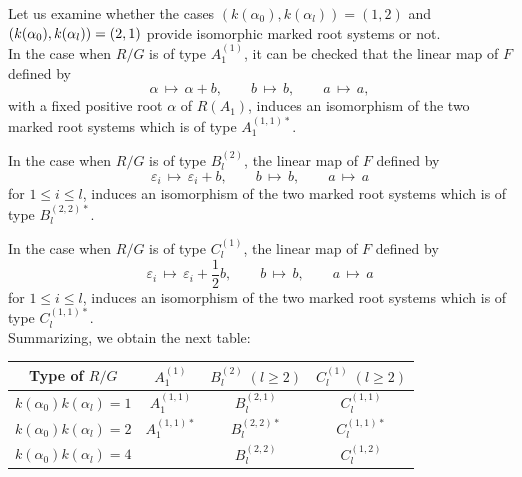\documentclass[11pt]{amsart}
\newcommand{\vep}{\varepsilon}
\begin{document}
{Let us examine whether the cases $(k(\alpha_0), k(\alpha_l))=(1,2)$ and 
$(k(\alpha_0), k(\alpha_l))\\ =(2,1)$ provide isomorphic marked root systems or not. \\

In the case when $R/G$ is of type $A_1^{(1)}$, it can be checked that the linear map of 
$F$ defined by 
\[ \alpha\,  \mapsto\,  \alpha+b, \qquad b\,  \mapsto\,  b, \qquad a\,  \mapsto\,  a, \]
with a fixed positive root $\alpha$ of $R(A_1)$, 
induces an isomorphism of the two marked root systems which is of type $A_1^{(1,1)\ast}$.

In the case when $R/G$ is of type $B_l^{(2)}$,  the linear map of $F$ defined by 
\[ \vep_i \,  \mapsto\,  \vep_i+b, \qquad b\,  \mapsto\,  b, \qquad a\,  \mapsto\,  a \]
for $1\leq i\leq l$, 
induces an isomorphism of the two marked root systems which is of type $B_l^{(2,2)\ast}$.

In the case when $R/G$ is of type $C_l^{(1)}$,  the linear map of $F$ defined by 
\[ \vep_i \,  \mapsto\,  \vep_i+\frac{1}{2}b, \qquad b\,  \mapsto\,  b, \qquad a\,  
\mapsto\,  a \]
for $1\leq i\leq l$, 
induces an isomorphism of the two marked root systems which is of type $C_l^{(1,1)\ast}$.\\

Summarizing, we obtain the next table: \\

\begin{center}
\begin{tabular}{|c||c|c|c|} \hline
Type of $R/G$ & $A_1^{(1)}$ & $B_l^{(2)}\; (l\geq 2)$ & $C_l^{(1)}\; (l\geq 2)$ \\ \hline
$k(\alpha_0)k(\alpha_l)=1$
& $A_1^{(1,1)}$ & $B_l^{(2,1)}$ & $C_l^{(1,1)}$ \\ \hline
$k(\alpha_0)k(\alpha_l)=2$
&  $A_1^{(1,1)\ast}$ & $B_l^{(2,2)\ast}$ & $C_l^{(1,1)\ast}$ \\ \hline
$k(\alpha_0)k(\alpha_l)=4$
& & $B_l^{(2,2)}$ & $C_l^{(1,2)}$ \\ \hline
\end{tabular}
\end{center}

}
\end{document}
